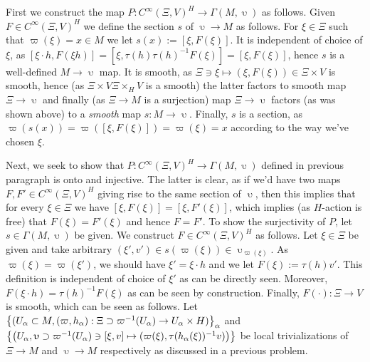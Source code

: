 \documentclass[8pt]{article} %
\begin{document}
	First we construct the map $P:C^\infty(\Xi,V)^H\to\Gamma(M,\upupsilon)$ as follows.
	Given $F\in C^\infty(\Xi,V)^H$ we define the section $s$ of $\upupsilon\to M$ as follows. For $\xi\in\Xi$
	such that $\varpi(\xi)=x\in M$ we let $s(x):=[\xi,F(\xi)]$. It is independent of choice of $\xi$, as
	$[\xi\cdot h,F(\xi h)]=[\xi,\tau(h)\tau(h)^{ -1 }F(\xi)]=[\xi,F(\xi)]$, hence $s$ is a well-defined $M\to\upupsilon$
	map. It is smooth, as $\Xi\ni\xi\mapsto(\xi,F(\xi))\in\Xi\times V$ is smooth, hence (as $\Xi\times V\Xi\times_HV$ is
	a smooth) the latter factors to smooth map $\Xi\to\upupsilon$ and finally (as $\Xi\to M$ is a surjection) map
	$\Xi\to\upupsilon$ factors (as was shown above) to a {\it smooth} map $s:M\to\upupsilon$. Finally, $s$ is a section,
	as $\varpi(s(x))=\varpi([\xi,F(\xi)])=\varpi(\xi)=x$ according to the way we've chosen $\xi$.\par
	Next, we seek to show that $P:C^\infty(\Xi,V)^H\to\Gamma(M,\upupsilon)$ defined in previous paragraph is onto and injective.
	The latter is clear, as if we'd have two maps $F,F'\in C^\infty(\Xi,V)^H$ giving rise to the same section of $\upupsilon$,
	then this implies that for every $\xi\in\Xi$ we have $[\xi,F(\xi)]=[\xi,F'(\xi)]$, which implies (as $H$-action is
	free) that $F(\xi)=F'(\xi)$ and hence $F=F'$. To show the surjectivity of $P$, let $s\in\Gamma(M,\upupsilon)$ be given.
	We construct $F\in C^\infty(\Xi,V)^H$ as follows. Let $\xi\in \Xi$ be given and take arbitrary
	$(\xi',v')\in s(\varpi(\xi))\in\upupsilon_{ \varpi
	(\xi) }$. As $\varpi(\xi)=\varpi(\xi')$, we should have $\xi'=\xi\cdot h$ and we let $F(\xi):=\tau(h)v'$.
	This definition is independent of choice of $\xi'$ as can be directly seen. Moreover, $F(\xi\cdot h)=\tau(h)^{ -1 }F(\xi)$
	as can be seen by construction. Finally, $F(\cdot):\Xi\to V$ is smooth, which can be seen as follows. Let
	$\left\{(U_\alpha\subset M,(\varpi,h_\alpha):\Xi\supset\varpi^{ -1 }(U_\alpha)\to U_\alpha\times H)\right\}_\alpha$
	and $\left\{ \left( U_\alpha,\upupsilon\supset\varpi^{ -1 }(U_\alpha)\ni[\xi,v]\mapsto(\varpi(\xi),\tau(h_\alpha(\xi))^
	{ -1 }v) \right) \right\}$ be local trivializations of $\Xi\to M$ and $\upupsilon\to M$ respectively as discussed in a previous problem.
\end{document}
